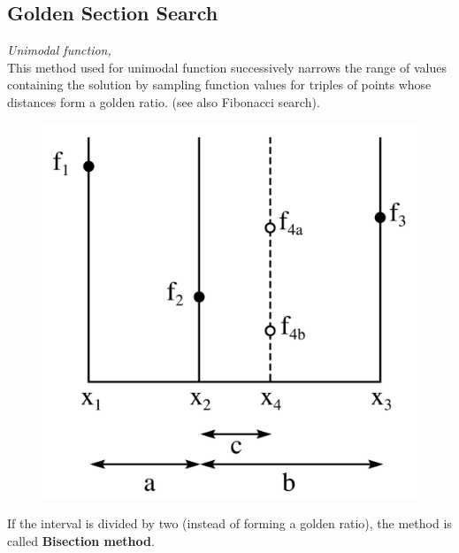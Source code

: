 \documentclass[twocolumn]{article}
\numberwithin{equation}{section}
\begin{document}
	\subsection{Golden Section Search}
	\emph{Unimodal function, }\\
This method used for unimodal function successively narrows the range of values containing the solution by sampling function values for triples of points whose distances form a golden ratio. (see also Fibonacci search).
\begin{figure}[H]
	\centering
    \includegraphics[width=.40\textwidth]{GoldenSectionSearch.png}
\end{figure}

If the interval is divided by two (instead of forming a golden ratio), the method is called \textbf{Bisection method}.
\end{document}
